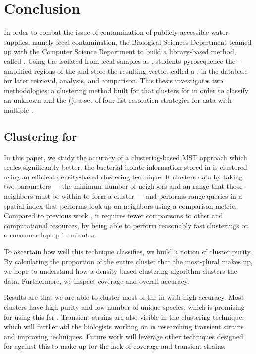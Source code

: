 \chapter{Conclusion}\label{chap:conclusion}
In order to combat the issue of contamination of publicly accessible water supplies, namely fecal contamination, the \cp{} Biological Sciences Department teamed up with the \cp{} Computer Science Department to build a library-based \mst{} method, called \cplop{}.
Using the \ecoli{} isolated from fecal samples as \fiblong{}, \cp{} students pyrosequence the \pcr{}-amplified \itslong{} regions of the \ecoli{} and store the resulting vector, called a \pyro{}, in the \cplop{} database for later retrieval, analysis, and comparison.
This thesis investigates two \mst{} methodologies: a \dbased{} clustering method built for \cplop{} that clusters for \bslongs{} in order to classify an unknown \isol{} and the \kraplong{} (\krap{}), a set of four \knnlong{} list resolution strategies for data with multiple \compfuncs{}.

\section{Clustering for \BSlongs{}}

In this paper, we study the accuracy of a clustering-based MST approach which scales significantly better: the bacterial isolate information stored in \cplop{} is clustered using an efficient density-based clustering technique.
It clusters data by taking two parameters --- the minimum number of neighbors and an \eps{} range that those neighbors must be within to form a cluster --- and performs range queries in a spatial index that performs  look-up on neighbors using a comparison metric.
Compared to previous work \cite{DBLP:conf/bibm/McGovernDKBVG15, montana2013ontological}, it requires fewer comparisons to other \isols{} and computational resources, by being able to perform reasonably fast clusterings on a consumer laptop in minutes.

To ascertain how well this technique classifies, we build a notion of cluster purity.
By calculating the proportion of the entire cluster that the most-plural \spec{} makes up, we hope to understand how a density-based clustering algorithm clusters the \cplop{} data.
Furthermore, we inspect coverage and overall accuracy.

Results are that we are able to cluster most of the \isols{} in \cplop{} with high accuracy. 
Most clusters have high purity and low number of unique species, which is promising for using this for \mst{}.
Transient strains are also visible in the clustering technique, which will further aid the biologists working on \cplop{} in researching transient strains and improving \mst{} techniques. 
Future work will leverage other \mst{} techniques designed for \cplop{} against this to make up for the lack of coverage and transient strains.
